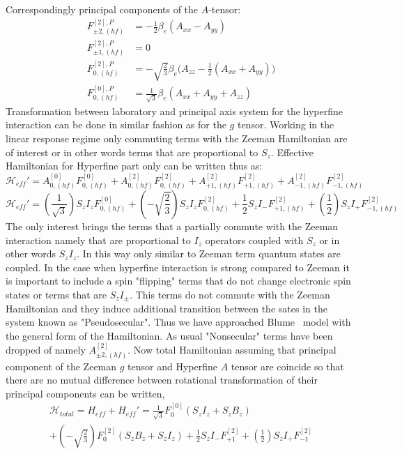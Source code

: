 Correspondingly principal components of the $A$-tensor: 
\begin{subequations}\label{eq:HyperAA}
\begin{align}
F^{[2],P}_{\pm2,(hf)} & =-\frac{1}{2}\beta_e(A_{xx}-A_{yy})\\
F^{[2],P}_{\pm1,(hf)} & =0\\
F^{[2],P}_{0,(hf)} & =-\sqrt{\frac{2}{3}}\beta_e\big(A_{zz}-\frac{1}{2}(A_{xx}+A_{yy})\big)\\
F^{[0],P}_{0,(hf)} & = \frac{1}{\sqrt{3}}\beta_e(A_{xx}+A_{yy}+A_{zz})
\end{align}
\end{subequations}
Transformation between laboratory and principal axis system for the hyperfine interaction can be done in similar fashion as for the $g$ tensor. Working in the linear response regime only commuting terms with the Zeeman Hamiltonian are of interest or in other words terms that are proportional to $S_z$. Effective Hamiltonian for Hyperfine part only can be written thus as: 
\begin{equation}
\mathcal{H}_{eff}'=A_{0,(hf)}^{[0]}F_{0,(hf)}^{[0]}+A_{0,(hf)}^{[2]} F_{0,(hf)}^{[2]}+A_{+1,(hf)}^{[2]} F_{+1,(hf)}^{[2]}+A_{-1,(hf)}^{[2]} F_{-1,(hf)}^{[2]}
\end{equation}
\begin{equation}
\mathcal{H}_{eff}'=(\frac{1}{\sqrt{3}})S_zI_zF_{0,(hf)}^{[0]}+(-\sqrt{\frac{2}{3}})S_zI_zF_{0,(hf)}^{[2]}+\frac{1}{2}S_zI_- F_{+1,(hf)}^{[2]}+(\frac{1}{2})S_zI_+ F_{-1,(hf)}^{[2]}
\end{equation}
The only interest brings the terms that a partially commute with the Zeeman interaction namely that are proportional to $I_z$ operators coupled with $S_z$ or in other words $S_zI_z$. In this way only similar to Zeeman term quantum states are coupled. In the case when hyperfine interaction is strong compared to Zeeman it is important to include a spin "flipping" terms that do not change electronic spin states or terms that are $S_zI_{\pm}$. This terms do not commute with the Zeeman Hamiltonian and they induce additional transition between the sates in the system known as "Pseudosecular". Thus we have approached Blume~\cite{blume} model with the general form of the Hamiltonian. As usual "Nonsecular" terms have been dropped of namely $A_{\pm2,(hf)}^{[2]}$. Now total Hamiltonian assuming that principal component of the Zeeman $g$ tensor and Hyperfine $A$ tensor are coincide so that there are no mutual difference between rotational transformation of their principal components can be written,
\begin{multline}
\mathcal{H}_{total}=H_{eff}+H_{eff}'=\frac{1}{\sqrt{3}}F_{0}^{[0]}(S_zI_z+S_zB_z) \\ +(-\sqrt{\frac{2}{3}})F_{0}^{[2]}(S_zB_z+S_zI_z)+\frac{1}{2}S_zI_- F_{+1}^{[2]} +(\frac{1}{2})S_zI_+ F_{-1}^{[2]}
\end{multline}
